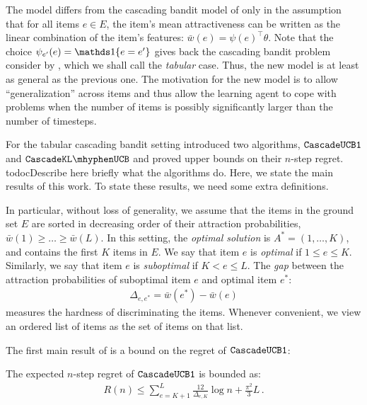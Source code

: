 The model differs from the cascading bandit model of \citet{kveton15cascade} only in the assumption that for all items $e\in E$, the item's mean attractiveness can be written as the linear combination of the item's features:
$\bar{w}(e) = \psi(e)^\top \theta$.
Note that the choice $\psi_{e'}(e) = \I{e=e'}$ gives back the cascading bandit problem consider by \cite{kveton15cascade}, which we shall call the \emph{tabular} case.
Thus, the new model is at least as general as the previous one.
The motivation for the new model is to allow ``generalization'' across items and thus allow the learning agent to cope with problems when the number of items is possibly significantly larger than the number of timesteps.

For the tabular cascading bandit setting \citet{kveton15cascade} introduced two algorithms,  ${\tt CascadeUCB1}$ and $\cascadeklucb$
and proved upper bounds on their $n$-step regret.
todoc{Describe here briefly what the algorithms do.}
Here, we state the main results of this work.
To state these results, we need some extra definitions.

In particular, without loss of generality, we assume that the items in the ground set $E$
 are sorted in decreasing order of their attraction probabilities, $\bar{w}(1) \geq \ldots \geq \bar{w}(L)$. In this setting, the \emph{optimal solution} is $A^\ast = (1, \dots, K)$, and contains the first $K$ items in $E$. We say that item $e$ is \emph{optimal} if $1 \leq e \leq K$. Similarly, we say that item $e$ is \emph{suboptimal} if $K < e \leq L$. The \emph{gap} between the attraction probabilities of suboptimal item $e$ and optimal item $e^\ast$:
\begin{align}
  \Delta_{e, e^\ast} = \bar{w}(e^\ast) - \bar{w}(e)
  \label{eq:gap}
\end{align}
measures the hardness of discriminating the items. Whenever convenient, we view an ordered list of items as the set of items on that list.

The first main result of  \citet{kveton15cascade} is a bound on the regret of ${\tt CascadeUCB1}$:
\begin{theorem}
\label{thm:ucb1} The expected $n$-step regret of ${\tt CascadeUCB1}$ is bounded as:
\begin{align*}
  R(n) \leq
  \sum_{e = K + 1}^L \frac{12}{\Delta_{e, K}} \log n + \frac{\pi^2}{3} L\,.
\end{align*}
\end{theorem}

